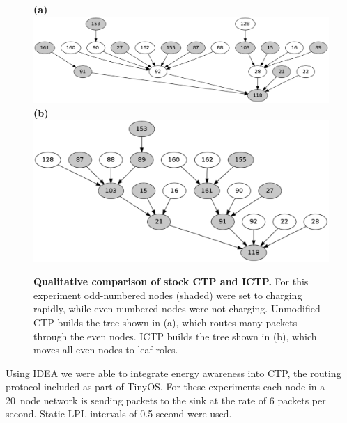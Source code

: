 \begin{figure}[t]
\begin{center}
\textbf{(a)}\\
\includegraphics[width=\hsize]{./5-idea/figs/used/ctp.pdf}\\
\textbf{(b)}\\
\includegraphics[width=\hsize]{./5-idea/figs/used/ictp.pdf}\\
\end{center}

\caption{\textbf{Qualitative comparison of stock CTP and ICTP.} For this
experiment odd-numbered nodes (shaded) were set to charging rapidly, while
even-numbered nodes were not charging. Unmodified CTP builds the tree shown
in (a), which routes many packets through the even nodes. ICTP builds the
tree shown in (b), which moves all even nodes to leaf roles.}

\label{idea-fig-ictpqualitative}
\end{figure}

Using IDEA we were able to integrate energy awareness into CTP, the routing
protocol included as part of TinyOS. For these experiments each node in a
20~node network is sending packets to the sink at the rate of 6 packets per
second. Static LPL intervals of 0.5 second were used. 

